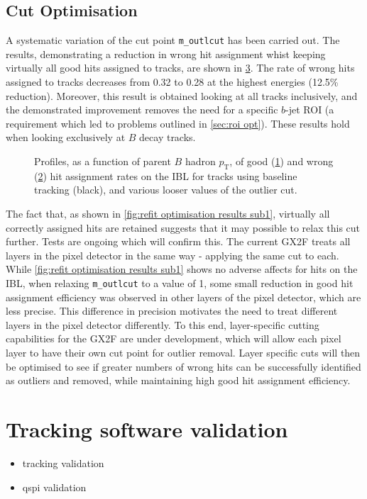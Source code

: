 \subsection{Cut Optimisation}\label{sec:cut opt}
A systematic variation of the cut point \texttt{m\_outlcut} has been carried out. The results, demonstrating a reduction in wrong hit assignment whist keeping virtually all good hits assigned to tracks, are shown in \cref{fig:outlier cut scan}. The rate of wrong hits assigned to tracks decreases from 0.32 to 0.28 at the highest energies (12.5\% reduction). Moreover, this result is obtained looking at all tracks inclusively, and the demonstrated improvement removes the need for a specific $b$-jet ROI (a requirement which led to problems outlined in \cref{sec:roi opt}). These results hold when looking exclusively at $B$ decay tracks.
%
\begin{figure}[!htbp]
    \centering
    \begin{subfigure}{.4\textwidth}
      \centering
      \caption{}
      \label{fig:outlier cut scan sub1}
    \end{subfigure}%
    \begin{subfigure}{.4\textwidth}
      \centering
      \caption{}
      \label{fig:outlier cut scan sub2}
    \end{subfigure}
    \caption{Profiles, as a function of parent $B$ hadron $p_{\text{T}}$, of good (\cref{fig:outlier cut scan sub1}) and wrong (\cref{fig:outlier cut scan sub2}) hit assignment rates on the IBL for tracks using baseline tracking (black), and various looser values of the outlier cut.}
    \label{fig:outlier cut scan}
\end{figure}
%
The fact that, as shown in \cref{fig:refit optimisation results sub1}, virtually all correctly assigned hits are retained suggests that it may possible to relax this cut further. Tests are ongoing which will confirm this. The current GX2F treats all layers in the pixel detector in the same way - applying the same cut to each. While \cref{fig:refit optimisation results sub1} shows no adverse affects for hits on the IBL, when relaxing \texttt{m\_outlcut} to a value of 1, some small reduction in good hit assignment efficiency was observed in other layers of the pixel detector, which are less precise. This difference in precision motivates the need to treat different layers in the pixel detector differently. To this end, layer-specific cutting capabilities for the GX2F are under development, which will allow each pixel layer to have their own cut point for outlier removal. Layer specific cuts will then be optimised to see if greater numbers of wrong hits can be successfully identified as outliers and removed, while maintaining high good hit assignment efficiency.


\section{Tracking software validation}\label{sec:r22-validation}

\begin{itemize}
  \item tracking validation
  \item qspi validation
\end{itemize}